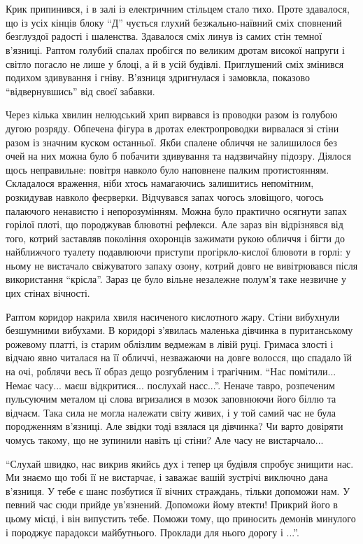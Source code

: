 \documentclass[a4paper,oneside]{book}
\begin{document}
\section*{} 
 
Крик припинився, і в залі із електричним стільцем стало тихо. Проте здавалося,
що із усіх кінців блоку “Д” чується глухий безжально-наївний сміх сповнений
безглуздої радості і шаленства. Здавалося сміх линув із самих стін темної
в’язниці. Раптом голубий спалах пробігся по великим дротам високої напруги і
світло погасло не лише у блоці, а й в усій будівлі. Приглушений сміх змінився
подихом здивування і гніву. В’язниця здригнулася і замовкла, показово
“відвернувшись” від своєї забавки.

Через кілька хвилин нелюдський хрип вирвався із проводки разом із  голубою
дугою розряду. Обпечена фігура в дротах електропроводки вирвалася зі стіни
разом із значним куском останньої. Якби спалене обличчя не залишилося без очей
на них можна було б побачити здивування та надзвичайну підозру. Діялося щось
неправильне: повітря навколо було наповнене палким протистоянням. Складалося
враження, ніби хтось намагаючись залишитись непомітним, розкидував навколо
феєрверки. Відчувався запах чогось зловіщого, чогось палаючого ненавистю і
непорозумінням. Можна було практично осягнути запах горілої плоті, що
породжував блювотні рефлекси. Але зараз він відрізнявся від того, котрий
заставляв покоління охоронців зажимати рукою обличчя і бігти до найближчого
туалету  подавлюючи приступи прогіркло-кислої блювоти в горлі: у ньому не
вистачало свіжуватого запаху озону, котрий довго не вивітрювався після
використання “крісла”. Зараз це було вільне незалежне полум’я таке незвичне у
цих стінах вічності.

Раптом коридор накрила хвиля насиченого кислотного жару. Стіни вибухнули
безшумними вибухами. В коридорі з’явилась маленька дівчинка в пуританському
рожевому платті, із старим облізлим ведмежам в лівій руці. Гримаса злості і
відчаю явно читалася на її обличчі, незважаючи на довге волосся, що спадало їй
на очі, роблячи весь її образ дещо розгубленим і трагічним. “Нас
помітили... Немає часу... маєш відкритися... послухай насс...”. Неначе тавро,
розпеченим пульсуючим металом ці слова вгризалися в мозок заповнюючи його
біллю та відчаєм. Така сила не могла належати світу живих, і у той самий час
не була породженням в’язниці. Але звідки тоді взялася ця дівчинка? Чи варто
довіряти чомусь такому, що не зупинили навіть ці стіни? Але часу не
вистарчало...

“Слухай швидко, нас викрив якийсь дух і тепер ця будівля спробує знищити
нас. Ми знаємо що тобі її не вистарчає, і заважає вашій зустрічі виключно дана
в’язниця. У тебе є шанс позбутися її вічних страждань, тільки допоможи нам. У
певний час сюди прийде ув’язнений. Допоможи йому втекти! Прикрий його в цьому
місці, і він випустить тебе. Поможи тому, що приносить демонів минулого і
породжує парадокси майбутнього. Проклади для нього дорогу і ...”.
\end{document}
